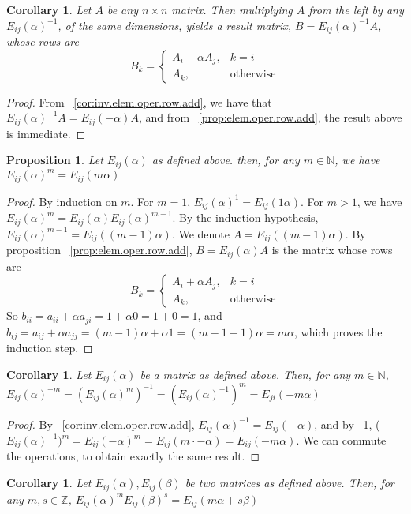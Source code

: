 \documentclass[12pt]{article}
\newtheorem{proposition}[theorem]{Proposition}
\newtheorem{corollary}[theorem]{Corollary}
\begin{document}
\begin{corollary}
Let $A$ be any $n \times n$ matrix. Then multiplying $A$ from the left by any $E_{ij}(\alpha)^{-1}$, of the same dimensions, yields a result matrix, $B=E_{ij}(\alpha)^{-1}A$, whose rows are $$
B_k=\begin{cases}
		A_i-\alpha A_j, & k=i\\
            A_k, & \text{otherwise}
		 \end{cases}
$$
\end{corollary}
\begin{proof}
From ~\ref{cor:inv.elem.oper.row.add}, we have that $E_{ij}(\alpha)^{-1}A=E_{ij}(-\alpha)A$, and from ~\ref{prop:elem.oper.row.add}, the result above is immediate.
\end{proof}
\begin{proposition} 
\label{prop:pow.elem.oper.row.add}
Let $E_{ij}(\alpha)$ as defined above. then, for any $m \in \mathbb{N}$, we have $E_{ij}(\alpha)^m=E_{ij}(m\alpha)$
\end{proposition}
\begin{proof}
By induction on $m$.
For $m=1$, $E_{ij}(\alpha)^1=E_{ij}(1\alpha)$. For $m>1$, we have $E_{ij}(\alpha)^m=E_{ij}(\alpha)E_{ij}(\alpha)^{m-1}$. By the induction hypothesis, $E_{ij}(\alpha)^{m-1}=E_{ij}((m-1)\alpha)$. We denote $A=E_{ij}((m-1)\alpha)$. By proposition ~\ref{prop:elem.oper.row.add}, $B=E_{ij}(\alpha)A$ is the matrix whose rows are
$$
B_k=\begin{cases}
		A_i+\alpha A_j, & k=i\\
            A_k, & \text{otherwise}
		 \end{cases}
$$
So $b_{ii}=a_{ii}+\alpha a_{ji}=1+\alpha 0=1+0=1$, and $b_{ij}=a_{ij}+\alpha a_{jj}=(m-1)\alpha+\alpha 1=(m-1+1)\alpha=m\alpha$, which proves the induction step.
\end{proof}
\begin{corollary}
\label{cor:inv.pow.elem.oper.row.add}
Let $E_{ij}(\alpha)$ be a matrix as defined above. Then, for any $m \in \mathbb{N}$, $E_{ij}(\alpha)^{-m}=(E_{ij}(\alpha)^m)^{-1}=(E_{ij}(\alpha)^{-1})^m=E_{ji}(-m\alpha)$
\end{corollary}
\begin{proof}
By ~\ref{cor:inv.elem.oper.row.add}, $E_{ij}(\alpha)^{-1}=E_{ij}(-\alpha)$, and by ~\ref{prop:pow.elem.oper.row.add}, ($E_{ij}(\alpha)^{-1})^m=E_{ij}(-\alpha)^m=E_{ij}(m\cdot -\alpha)=E_{ij}(-m\alpha)$. We can commute the operations, to obtain exactly the same result.
\end{proof}
\begin{corollary}
Let $E_{ij}(\alpha), E_{ij}(\beta)$ be two matrices as defined above. Then, for any $m,s \in \mathbb{Z}$, $E_{ij}(\alpha)^m E_{ij}(\beta)^s=E_{ij}(m\alpha+s \beta)$
\end{corollary}
\end{document}
